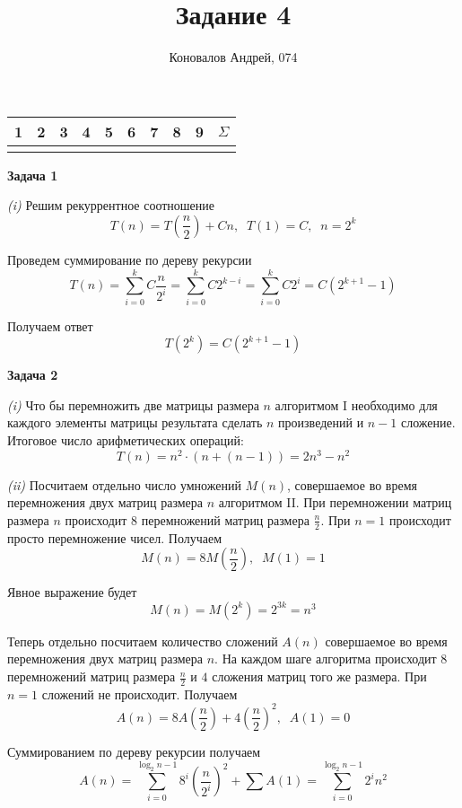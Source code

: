 \documentclass[10pt]{article}
\title{Задание 4}
\author{Коновалов Андрей, 074}
\date{}
\begin{document}
\maketitle

\noindent
\begin{tabularx}{\textwidth}{|C|C|C|C|C|C|C|C|C|C|}
   & 2 & 3 & 4 & 5 & 6 & 7 & 8 & 9 & $\Sigma$ \\
  \hline
  &&&&&&&&& \\
  \hline
\end{tabularx}

\bigskip

{\bf Задача 1}

{\it (i)}
Решим рекуррентное соотношение
$$
  T(n) = T \left( \frac{n}{2} \right) + C n, \;\; T(1) = C, \;\; n = 2^k
$$

Проведем суммирование по дереву рекурсии
$$
  T(n) = \sum \limits_{i = 0}^k C \frac{n}{2^i} = \sum \limits_{i = 0}^k C 2^{k - i} = \sum \limits_{i = 0}^k C 2^{i} = C (2^{k + 1} - 1)
$$

Получаем ответ
$$
  T(2^k) = C (2^{k + 1} - 1)
$$

\medskip

{\bf Задача 2}

{\it (i)}
Что бы перемножить две матрицы размера $n$ алгоритмом I необходимо для каждого элементы матрицы результата сделать $n$ произведений и $n - 1$ сложение. Итоговое число арифметических операций:
$$
  T(n) = n^2 \cdot (n + (n - 1)) = 2 n^3 - n^2
$$

\smallskip

{\it (ii)}
Посчитаем отдельно число умножений $M(n)$, совершаемое во время перемножения двух матриц размера $n$ алгоритмом II. При перемножении матриц размера $n$ происходит $8$ перемножений матриц размера $\frac{n}{2}$. При $n = 1$ происходит просто перемножение чисел. Получаем
$$
  M(n) = 8 M \left( \frac{n}{2} \right), \;\; M(1) = 1
$$

Явное выражение будет
$$
  M(n) = M(2^k) = 2^{3k} = n^3
$$

Теперь отдельно посчитаем количество сложений $A(n)$ совершаемое во время перемножения двух матриц размера $n$. На каждом шаге алгоритма происходит $8$ перемножений матриц размера $\frac{n}{2}$ и $4$ сложения матриц того же размера. При $n = 1$ сложений не происходит. Получаем
$$
  A(n) = 8 A \left( \frac{n}{2} \right) + 4 \left( \frac{n}{2} \right)^2, \;\; A(1) = 0
$$

Суммированием по дереву рекурсии получаем
$$
  A(n) = \sum \limits_{i = 0}^{\log_2{n} - 1} 8^i \left( \frac{n}{2^i} \right)^2  + \sum A(1) = \sum \limits_{i = 0}^{\log_2{n} - 1} 2^i n^2
$$
\end{document}
